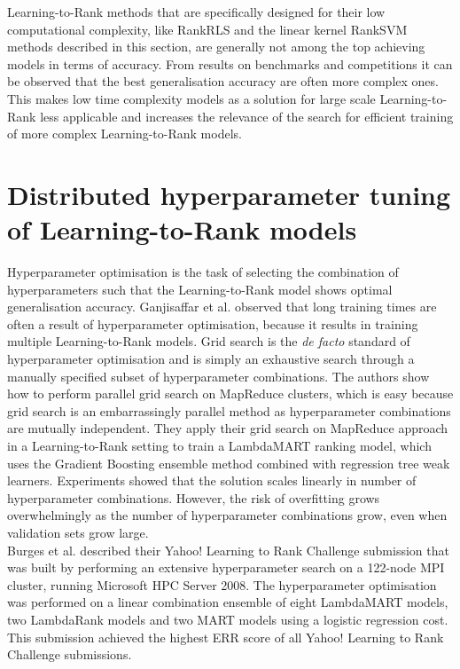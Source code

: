 Learning-to-Rank methods that are specifically designed for their low computational complexity, like RankRLS and the linear kernel RankSVM methods described in this section, are generally not among the top achieving models in terms of accuracy. From results on benchmarks and competitions it can be observed that the best generalisation accuracy are often more complex ones. This makes low time complexity models as a solution for large scale Learning-to-Rank less applicable and increases the relevance of the search for efficient training of more complex Learning-to-Rank models.\\ 

\section{Distributed hyperparameter tuning of Learning-to-Rank models}
Hyperparameter optimisation is the task of selecting the combination of hyperparameters such that the Learning-to-Rank model shows optimal generalisation accuracy. Ganjisaffar et al. \cite{Ganjisaffar2011, Ganjisaffar2011b} observed that long training times are often a result of hyperparameter optimisation, because it results in training multiple Learning-to-Rank models. Grid search is the \emph{de facto} standard of hyperparameter optimisation and is simply an exhaustive search through a manually specified subset of hyperparameter combinations. The authors show how to perform parallel grid search on MapReduce clusters, which is easy because grid search is an embarrassingly parallel method as hyperparameter combinations are mutually independent. They apply their grid search on MapReduce approach in a Learning-to-Rank setting to train a LambdaMART \cite{Wu2008} ranking model, which uses the Gradient Boosting \cite{Friedman2002} ensemble method combined with regression tree weak learners. Experiments showed that the solution scales linearly in number of hyperparameter combinations. However, the risk of overfitting grows overwhelmingly as the number of hyperparameter combinations grow, even when validation sets grow large.\\

Burges et al. \cite{Burges2011} described their Yahoo! Learning to Rank Challenge submission that was built by performing an extensive hyperparameter search on a 122-node MPI cluster, running Microsoft HPC Server 2008. The hyperparameter optimisation was performed on a linear combination ensemble of eight LambdaMART models, two LambdaRank models and two MART models using a logistic regression cost. This submission achieved the highest \ac{ERR} score of all Yahoo! Learning to Rank Challenge submissions.\\

